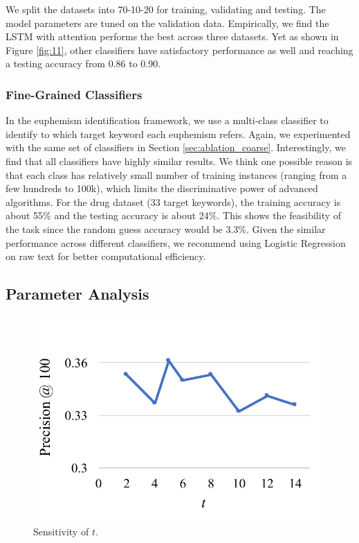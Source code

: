 We split the datasets into 70-10-20 for training, validating and testing. 
The model parameters are tuned on the validation data. 
Empirically, we find the LSTM with attention performs the best across three datasets. 
Yet as shown in Figure \ref{fig:11}, other classifiers have satisfactory performance as well and reaching a testing accuracy from 0.86 to 0.90. 



\subsubsection{Fine-Grained Classifiers}
\label{sec:ablation_fine-grained}
In the euphemism identification framework, we use a multi-class classifier to identify to which target keyword each euphemism refers. 
Again, we experimented with the same set of classifiers in Section \ref{sec:ablation_coarse}. 
Interestingly, we find that all classifiers have highly similar results. 
We think one possible reason is that each class has relatively small number of training instances (ranging from a few hundreds to 100k), which limits the discriminative power of advanced algorithms. 
For the drug dataset (33 target keywords), the training accuracy is about 55\% and the testing accuracy is about 24\%. 
This shows the feasibility of the task since the random guess accuracy would be 3.3\%. 
Given the similar performance across different classifiers, we recommend using Logistic Regression on raw text for better computational efficiency. 




\subsection{Parameter Analysis}
\label{sec:dis_parameter_analysis}
\begin{figure}[ht!]
	\centering
	\includegraphics[width=0.6\linewidth]{figures/12}
	\caption{Sensitivity of $t$.}
	\label{fig:12}
\end{figure}

